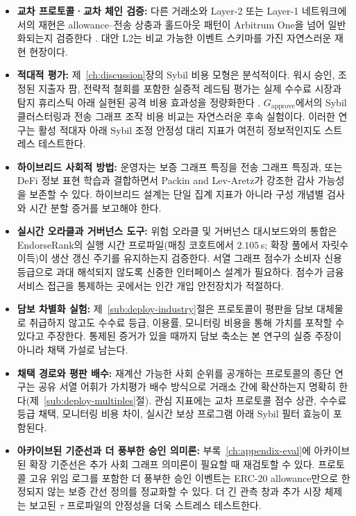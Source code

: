 \begin{itemize}
\item \textbf{교차 프로토콜·교차 체인 검증:} 다른 거래소와 Layer-2 또는 Layer-1 네트워크에서의 재현은 allowance--전송 상충과 홀드아웃 패턴이 Arbitrum One을 넘어 일반화되는지 검증한다 . 대안 L2는 비교 가능한 이벤트 스키마를 가진 자연스러운 재현 현장이다.

\item \textbf{적대적 평가:} 제~\ref{ch:discussion}장의 Sybil 비용 모형은 분석적이다. 워시 승인, 조정된 지출자 팜, 전략적 철회를 포함한 실증적 레드팀 평가는 실제 수수료 시장과 탐지 휴리스틱 아래 실현된 공격 비용 효과성을 정량화한다 . $G_{\text{approve}}$에서의 Sybil 클러스터링과 전송 그래프 조작 비용 비교는 자연스러운 후속 실험이다. 이러한 연구는 활성 적대자 아래 Sybil 조정 안정성 대리 지표가 여전히 정보적인지도 스트레스 테스트한다.

\item \textbf{하이브리드 사회적 방법:} 운영자는 보증 그래프 특징을 전송 그래프 특징과, 또는 DeFi 정보 표현 학습과  결합하면서 Packin and Lev-Aretz가 강조한 감사 가능성을 보존할 수 있다. 하이브리드 설계는 단일 집계 지표가 아니라 구성 개념별 검사와 시간 분할 증거를 보고해야 한다.

\item \textbf{실시간 오라클과 거버넌스 도구:} 위험 오라클 및 거버넌스 대시보드와의 통합은 EndorseRank의 실행 시간 프로파일(매칭 코호트에서 $2.105$\,s; 확장 풀에서 자릿수 이득)이 생산 갱신 주기를 유지하는지 검증한다. 서열 그래프 점수가 소비자 신용 등급으로 과대 해석되지 않도록 신중한 인터페이스 설계가 필요하다. 점수가 금융 서비스 접근을 통제하는 곳에서는 인간 개입 안전장치가 적절하다.

\item \textbf{담보 차별화 실험:} 제~\ref{sub:deploy-industry}절은 프로토콜이 평판을 담보 대체물로 취급하지 않고도 수수료 등급, 이용률, 모니터링 비용을 통해 가치를 포착할 수 있다고 주장한다. 통제된 증거가 있을 때까지 담보 축소는 본 연구의 실증 주장이 아니라 채택 가설로 남는다.

\item \textbf{채택 경로와 평판 배수:} 재계산 가능한 사회 순위를 공개하는 프로토콜의 종단 연구는 공유 서열 어휘가 가치평가 배수 방식으로 거래소 간에 확산하는지 명확히 한다(제~\ref{sub:deploy-multiples}절). 관심 지표에는 교차 프로토콜 점수 상관, 수수료 등급 채택, 모니터링 비용 차이, 실시간 보상 프로그램 아래 Sybil 필터 효능이 포함된다.

\item \textbf{아카이브된 기준선과 더 풍부한 승인 의미론:} 부록~\ref{ch:appendix-eval}에 아카이브된 확장 기준선은 추가 사회 그래프 의미론이 필요할 때 재검토할 수 있다. 프로토콜 고유 위임 로그를 포함한 더 풍부한 승인 이벤트는 ERC-20 allowance만으로 한정되지 않는 보증 간선 정의를 정교화할 수 있다. 더 긴 관측 창과 추가 시장 체제는 보고된 $\tau$ 프로파일의 안정성을 더욱 스트레스 테스트한다.
\end{itemize}

